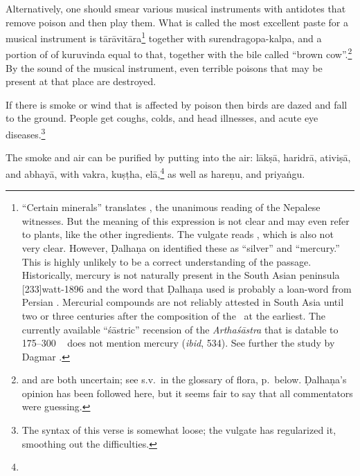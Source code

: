 \begin{translation}
Alternatively, one should smear  various musical instruments with
antidotes that remove poison and then play  them. What is called the
most  excellent paste for a musical instrument is
\gls{tārāvitāra}\footnote{“Certain  minerals” translates
    , the unanimous  reading of the Nepalese  witnesses.
    But the meaning of this expression is not  clear and may even refer to
    plants, like the other ingredients.  The vulgate  reads ,  which is also not very clear.  However, Ḍalhaṇa on
     identified  these as “silver” and “mercury.” This is
    highly unlikely  to be a correct understanding of  the passage.
    Historically, mercury is not  naturally present in the South  Asian
    peninsula [233]{watt-1896}  and the word  that
    Ḍalhaṇa used is probably a loan-word from  Persian \citep[sub
    \emph{paranda, parranda}][244b]{stei-pers}. Mercurial compounds are
    not  reliably attested in South Asia until two or three  centuries
    after the composition  of the \SS\ at the earliest.  The currently
    available  “śāstric” recension of the  \emph{Arthaśāstra} that is
    datable to 175--300 \CE\  \citep[29--31]{oliv-2013} does  not mention
    mercury (\emph{ibid}, 534). See further the study by Dagmar \citet[17,
    \emph{et passim}]{wuja-2013b}.}  together with \gls{surendragopa-kalpa}, and
    a  portion of of \gls{kuruvinda} equal to that,  together with the
    bile called  “brown cow”.\footnote{  and
         are both uncertain; see s.v.\ in the glossary of flora,
        p.\,\pageref{glossary:flora} below. Ḍalhaṇa's opinion has been
        followed here, but it seems fair to say that all commentators were
        guessing.} By the sound of  the musical instrument, even terrible
        poisons that may be present at that place are destroyed.

\item [16]  

If there is smoke or wind that  is affected by poison then  birds are
dazed and fall to the ground.  People get  coughs, colds, and head 
illnesses, and acute eye diseases.\footnote{The syntax  of this verse
    is somewhat  loose; the vulgate has regularized it, smoothing  out
    the difficulties.}

\item
[17]  

The smoke and air can be  purified by putting into the  air:  \gls{lākṣā}, 
\gls{haridrā}, \gls{ativiṣā}, and \gls{abhayā}, with \gls{vakra}, \gls{kuṣṭha}, 
\gls{elā},\footnote{} as well as \gls{hareṇu}, and \gls{priyaṅgu}.  
\end{translation}  



